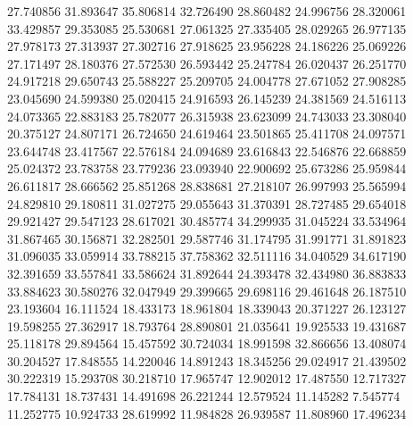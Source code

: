 27.740856
31.893647
35.806814
32.726490
28.860482
24.996756
28.320061
33.429857
29.353085
25.530681
27.061325
27.335405
28.029265
26.977135
27.978173
27.313937
27.302716
27.918625
23.956228
24.186226
25.069226
27.171497
28.180376
27.572530
26.593442
25.247784
26.020437
26.251770
24.917218
29.650743
25.588227
25.209705
24.004778
27.671052
27.908285
23.045690
24.599380
25.020415
24.916593
26.145239
24.381569
24.516113
24.073365
22.883183
25.782077
26.315938
23.623099
24.743033
23.308040
20.375127
24.807171
26.724650
24.619464
23.501865
25.411708
24.097571
23.644748
23.417567
22.576184
24.094689
23.616843
22.546876
22.668859
25.024372
23.783758
23.779236
23.093940
22.900692
25.673286
25.959844
26.611817
28.666562
25.851268
28.838681
27.218107
26.997993
25.565994
24.829810
29.180811
31.027275
29.055643
31.370391
28.727485
29.654018
29.921427
29.547123
28.617021
30.485774
34.299935
31.045224
33.534964
31.867465
30.156871
32.282501
29.587746
31.174795
31.991771
31.891823
31.096035
33.059914
33.788215
37.758362
32.511116
34.040529
34.617190
32.391659
33.557841
33.586624
31.892644
24.393478
32.434980
36.883833
33.884623
30.580276
32.047949
29.399665
29.698116
29.461648
26.187510
23.193604
16.111524
18.433173
18.961804
18.339043
20.371227
26.123127
19.598255
27.362917
18.793764
28.890801
21.035641
19.925533
19.431687
25.118178
29.894564
15.457592
30.724034
18.991598
32.866656
13.408074
30.204527
17.848555
14.220046
14.891243
18.345256
29.024917
21.439502
30.222319
15.293708
30.218710
17.965747
12.902012
17.487550
12.717327
17.784131
18.737431
14.491698
26.221244
12.579524
11.145282
7.545774
11.252775
10.924733
28.619992
11.984828
26.939587
11.808960
17.496234
